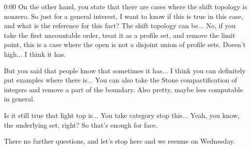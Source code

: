 \begin{unfinished}{0:00}
On the other hand, you state that there are cases where the shift topology is nonzero. So just for a general interest, I want to know if this is true in this case, and what is the reference for this fact? The shift topology can be... No, if you take the first uncountable order, treat it as a profile set, and remove the limit point, this is a case where the open is not a disjoint union of profile sets. Doesn't high... I think it has.

But you said that people know that sometimes it has... I think you can definitely put examples where there is... You can also take the Stone compactification of integers and remove a part of the boundary. Also pretty, maybe less computable in general.

Is it still true that light top is... You take category stop this... Yeah, you know, the underlying set, right? So that's enough for face.

There no further questions, and let's stop here and we resume on Wednesday.
\end{unfinished}